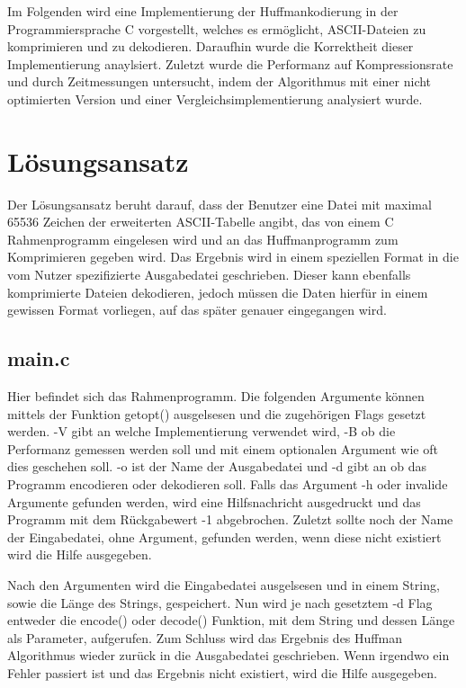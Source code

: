 \documentclass[course=erap]{aspdoc}
\begin{document}
Im Folgenden wird eine Implementierung der Huffmankodierung in der Programmiersprache C vorgestellt, welches es ermöglicht, ASCII-Dateien
zu komprimieren und zu dekodieren. Daraufhin wurde die Korrektheit  %
dieser Implementierung anaylsiert. Zuletzt wurde die Performanz auf Kompressionsrate und durch Zeitmessungen untersucht, indem der Algorithmus mit einer nicht optimierten Version und einer Vergleichsimplementierung analysiert wurde.

\section{Lösungsansatz}

Der Lösungsansatz beruht darauf, dass der Benutzer eine Datei mit maximal 65536 Zeichen der erweiterten ASCII-Tabelle angibt, das von einem C Rahmenprogramm eingelesen wird und an das Huffmanprogramm zum Komprimieren gegeben wird. Das Ergebnis wird in einem speziellen Format in die vom Nutzer spezifizierte Ausgabedatei geschrieben. Dieser kann ebenfalls komprimierte Dateien dekodieren, jedoch müssen die Daten hierfür in einem gewissen Format vorliegen, auf das später %
genauer eingegangen wird.

\subsection{main.c}

Hier befindet sich das Rahmenprogramm. Die folgenden Argumente können mittels der Funktion getopt() ausgelsesen und die zugehörigen Flags gesetzt werden.
-V gibt an welche Implementierung verwendet wird, -B ob die Performanz gemessen werden soll und mit einem optionalen Argument wie oft dies geschehen soll.
-o ist der Name der Ausgabedatei und -d gibt an ob das Programm encodieren oder dekodieren soll. Falls das Argument -h oder invalide Argumente gefunden werden, wird eine Hilfsnachricht ausgedruckt und das Programm mit dem Rückgabewert -1 abgebrochen.
Zuletzt sollte noch der Name der Eingabedatei, ohne Argument, gefunden werden, wenn diese nicht existiert wird die Hilfe ausgegeben.

Nach den Argumenten wird die Eingabedatei ausgelsesen und in einem String, sowie die Länge des Strings, gespeichert. Nun wird je nach gesetztem -d Flag entweder die encode() oder decode() Funktion, mit dem String und dessen Länge als Parameter, aufgerufen.
Zum Schluss wird das Ergebnis des Huffman Algorithmus wieder zurück in die Ausgabedatei geschrieben. Wenn irgendwo ein Fehler passiert ist und das Ergebnis nicht existiert, wird die Hilfe ausgegeben.
\end{document}
